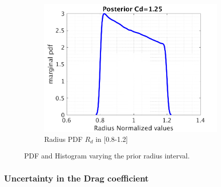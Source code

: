 \documentclass{article}
\begin{document}
\begin{figure}[H]
\begin{center}
\begin{subfigure}{0.4\textwidth}
    \centering\includegraphics[width=1.1\textwidth,keepaspectratio]{images/inverse_problem/infer_radius/drag_125/range_long/radiusraw_PDF.png}
    \caption{\centering Radius PDF  $R_d$ in [0.8-1.2]}
  \end{subfigure}


\caption{PDF and Histogram varying the prior radius interval.}
\label{fig:radius_interval} 
 \end{center}
\end{figure}

\newpage
\subsubsection{Uncertainty in the  Drag coefficient}
 
\end{document}
